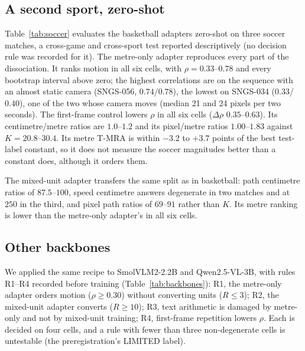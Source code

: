\documentclass[preprint,number]{elsarticle}
\begin{document}
\subsection{A second sport, zero-shot}
\label{sec:soccer}

Table~\ref{tab:soccer} evaluates the basketball adapters zero-shot on three
soccer matches, a cross-game and cross-sport test reported descriptively (no
decision rule was recorded for it). The metre-only adapter reproduces every
part of the dissociation. It ranks motion in all six
cells, with $\rho=0.33$--$0.78$ and every bootstrap interval above zero; the
highest correlations are on the sequence with an almost static camera
(SNGS-056, $0.74$/$0.78$), the lowest on SNGS-034 ($0.33$/$0.40$), one of the
two whose camera moves (median 21 and 24 pixels per two seconds). The
first-frame control lowers $\rho$ in all six cells ($\Delta\rho$
$0.35$--$0.63$). Its centimetre/metre ratios are $1.0$--$1.2$ and its
pixel/metre ratios $1.00$--$1.83$ against $K=20.8$--$30.4$. Its metre T-MRA is
within $-3.2$ to $+3.7$ points of the best test-label constant, so it does not
measure the soccer magnitudes better than a constant does, although it orders
them.



The mixed-unit adapter transfers the same split as in basketball: path
centimetre ratios of $87.5$--$100$, speed centimetre answers degenerate in two
matches and at $250$ in the third, and pixel path ratios of $69$--$91$ rather
than $K$. Its metre ranking is lower than the metre-only adapter's in all six
cells.

\subsection{Other backbones}
\label{sec:backbones}

We applied the same recipe to SmolVLM2-2.2B and Qwen2.5-VL-3B, with rules R1--R4
recorded before training (Table~\ref{tab:backbones}): R1, the metre-only adapter
orders motion ($\rho\ge0.30$) without converting units ($R\le3$); R2, the
mixed-unit adapter converts ($R\ge10$); R3, text arithmetic is damaged by
metre-only and not by mixed-unit training; R4, first-frame repetition lowers
$\rho$. Each is decided on four cells, and a rule with fewer than three
non-degenerate cells is untestable (the preregistration's LIMITED label).


\end{document}
